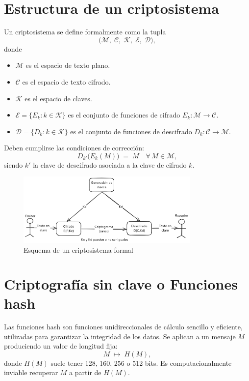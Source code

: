 \section{Estructura de un criptosistema}

Un criptosistema se define formalmente como la tupla
\[
  \bigl(\mathcal M,\;\mathcal C,\;\mathcal K,\;\mathcal E,\;\mathcal D\bigr),
\]
donde
\begin{itemize}
  \item \(\mathcal M\) es el espacio de texto plano.
  \item \(\mathcal C\) es el espacio de texto cifrado.
  \item \(\mathcal K\) es el espacio de claves.
  \item \(\mathcal E=\{E_k: k\in\mathcal K\}\) es el conjunto de funciones de cifrado \(E_k:\mathcal M\to\mathcal C\).
  \item \(\mathcal D=\{D_k: k\in\mathcal K\}\) es el conjunto de funciones de descifrado \(D_k:\mathcal C\to\mathcal M\).
\end{itemize}
Deben cumplirse las condiciones de corrección:
\[
  D_{k'}\bigl(E_k(M)\bigr)\;=\;M
  \quad\forall\,M\in\mathcal M,
\]
siendo \(k'\) la clave de descifrado asociada a la clave de cifrado \(k\).

\begin{figure}[H]
    \centering
    \includegraphics[width=0.8\textwidth]{imagenes/Esquema_criptosistema_cifrado_descifrado.png}
    \caption{Esquema de un criptosistema formal}
    \label{fig:esquema_criptosistema_cifrado_descifrado}
\end{figure}

\section{Criptografía sin clave o Funciones hash}
Las funciones hash son funciones unidireccionales de cálculo sencillo y eficiente, utilizadas para garantizar la integridad de los datos. Se aplican a un mensaje \(M\) produciendo un valor de longitud fija:
\[
  M \;\longmapsto\; H(M),
\]
donde \(H(M)\) suele tener 128, 160, 256 o 512 bits. Es computacionalmente inviable recuperar \(M\) a partir de \(H(M)\).

